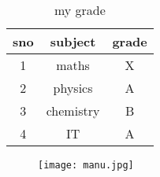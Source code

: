 \documentclass[12pt]{article}
\begin{document}
\begin{table}

\newpage

\section*{\color{orange}{Grade}}

\centering \caption{my grade}

\begin{tabular}{|c|c|c|} \hline

sno & subject & grade\\ \hline

1 & maths & X\\ \hline

2 & physics & A\\ \hline

3 & chemistry & B\\ \hline

4 & IT & A\\ \hline

\end{tabular}

\label{table1}

\end{table}

\begin{figure}

\centering

\texttt{[image: manu.jpg]}

\caption{\large{}}


\end{figure}
\end{document}
